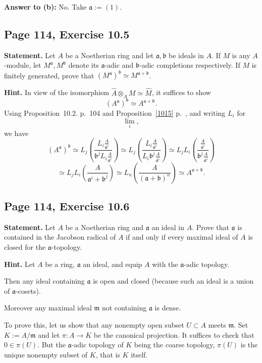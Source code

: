 \documentclass[parskip=half,fontsize=12pt]{scrartcl}%
\newcommand{\mf}{\mathfrak}
\newcommand{\aaa}{\mf a}
\newcommand{\bbb}{\mf b}
\newcommand{\mmm}{\mf m}
\begin{document}
\textbf{Answer to (b):} No. Take $\aaa:=(1)$. 

\subsection{Page 114, Exercise 10.5}%

\textbf{Statement.} Let $A$ be a Noetherian ring and let $\aaa,\bbb$ be ideals in $A$. If $M$ is any $A$-module, let $M^\aaa,M^\bbb$ denote its $\aaa$-adic and $\bbb$-adic completions respectively. If $M$ is finitely generated, prove that $(M^\aaa)^\bbb\simeq M^{\aaa+\bbb}$.

\textbf{Hint.} In view of the isomorphism $\widehat A\otimes_AM\simeq\widehat M$, it suffices to show 
\begin{equation}\label{aba+b}
(A^\aaa)^\bbb\simeq A^{\aaa+\bbb}. 
\end{equation} 
Using Proposition~10.2. p.~104 and Proposition~\ref{1015} p.~\pageref{1015}, and writing $L_i$ for 
$$
\lim_i,
$$ 
we have 
$$
(A^\aaa)^\bbb\simeq 
L_j\left(\frac{L_i\frac{A}{\aaa^i}}{\bbb^jL_i\frac{A}{\aaa^i}}\right)\simeq 
L_j\left(\frac{L_i\frac{A}{\aaa^i}}{L_i\bbb^j\frac{A}{\aaa^i}}\right)\simeq 
L_jL_i\left(\frac{\frac{A}{\aaa^i}}{\bbb^j\frac{A}{\aaa^i}}\right)
$$ 
$$
\simeq L_jL_i\left(\frac{A}{\aaa^i+\bbb^j}\right)
\simeq L_n\left(\frac{A}{(\aaa+\bbb)^n}\right)
\simeq A^{\aaa+\bbb}.
$$ 

\subsection{Page 114, Exercise 10.6}%

\textbf{Statement.} Let $A$ be a Noetherian ring and $\aaa$ an ideal in $A$. Prove that $\aaa$ is contained in the Jacobson radical of $A$ if and only if every maximal ideal of $A$ is closed for the $\aaa$-topology.

\textbf{Hint.} Let $A$ be a ring, $\aaa$ an ideal, and equip $A$ with the $\aaa$-adic topology. 

Then any ideal containing $\aaa$ is open and closed (because such an ideal is a union of $\aaa$-cosets). 

Moreover any maximal ideal $\mmm$ not containing $\aaa$ is dense.

To prove this, let us show that any nonempty open subset $U\subset A$ meets $\mmm$. Set $K:=A/\mmm$ and let $\pi:A\to K$ be the canonical projection. It suffices to check that $0\in\pi(U)$. But the $\aaa$-adic topology of $K$ being the coarse topology, $\pi(U)$ is the unique nonempty subset of $K$, that is $K$ itself. %
\end{document}
